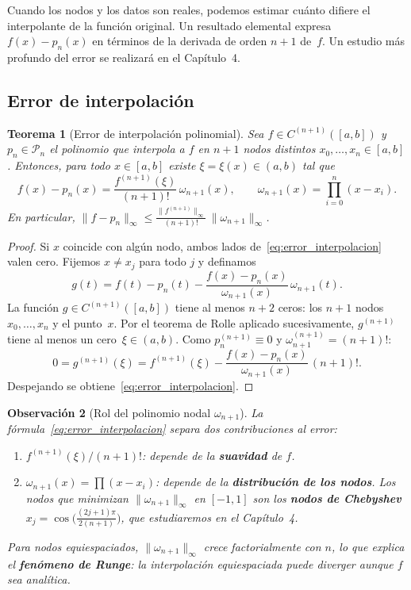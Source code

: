 \documentclass[a4paper,11pt]{report}
\newtheorem{theorem}{Teorema}[chapter]
\newtheorem{remark}[theorem]{Observación}
\begin{document}
Cuando los nodos y los datos son reales, podemos estimar cuánto difiere el interpolante de la función original. Un resultado elemental expresa $f(x)-p_n(x)$ en términos de la derivada de orden $n+1$ de~$f$. Un estudio más profundo del error se realizará en el Capítulo~4.

\subsection{Error de interpolación}\label{subsec:error_interpolacion}

\begin{theorem}[Error de interpolación polinomial]\label{thm:error_interpolacion}
Sea $f\in C^{(n+1)}([a,b])$ y $p_n\in\mathcal{P}_n$ el polinomio que interpola a $f$ en $n+1$ nodos distintos $x_0,\ldots,x_n\in[a,b]$.  Entonces, para todo $x\in[a,b]$ existe $\xi=\xi(x)\in(a,b)$ tal que
\begin{equation}\label{eq:error_interpolacion}
f(x)-p_n(x) = \frac{f^{(n+1)}(\xi)}{(n+1)!}\,\omega_{n+1}(x), \qquad \omega_{n+1}(x)=\prod_{i=0}^n(x-x_i).
\end{equation}
En particular, $\displaystyle\|f-p_n\|_\infty \le \frac{\|f^{(n+1)}\|_\infty}{(n+1)!}\,\|\omega_{n+1}\|_\infty$.
\end{theorem}

\begin{proof}
Si $x$ coincide con algún nodo, ambos lados de~\eqref{eq:error_interpolacion} valen cero.  Fijemos $x\neq x_j$ para todo $j$ y definamos
\[
g(t) = f(t) - p_n(t) - \frac{f(x)-p_n(x)}{\omega_{n+1}(x)}\,\omega_{n+1}(t).
\]
La función $g\in C^{(n+1)}([a,b])$ tiene al menos $n+2$ ceros: los $n+1$ nodos $x_0,\ldots,x_n$ y el punto~$x$.  Por el teorema de Rolle aplicado sucesivamente, $g^{(n+1)}$ tiene al menos un cero~$\xi\in(a,b)$.  Como $p_n^{(n+1)}\equiv 0$ y $\omega_{n+1}^{(n+1)}=(n+1)!$:
\[
0 = g^{(n+1)}(\xi) = f^{(n+1)}(\xi) - \frac{f(x)-p_n(x)}{\omega_{n+1}(x)}\,(n+1)!.
\]
Despejando se obtiene~\eqref{eq:error_interpolacion}.
\end{proof}

\begin{remark}[Rol del polinomio nodal $\omega_{n+1}$]
La fórmula~\eqref{eq:error_interpolacion} separa dos contribuciones al error:
\begin{enumerate}
\item $f^{(n+1)}(\xi)/(n+1)!$: depende de la \textbf{suavidad} de $f$.
\item $\omega_{n+1}(x) = \prod(x-x_i)$: depende de la \textbf{distribución de los nodos}.  Los nodos que minimizan $\|\omega_{n+1}\|_\infty$ en $[-1,1]$ son los \textbf{nodos de Chebyshev} $x_j=\cos\!\bigl(\frac{(2j+1)\pi}{2(n+1)}\bigr)$, que estudiaremos en el Capítulo~4.
\end{enumerate}
Para nodos \emph{equiespaciados}, $\|\omega_{n+1}\|_\infty$ crece factorialmente con $n$, lo que explica el \textbf{fenómeno de Runge}: la interpolación equiespaciada puede diverger aunque $f$ sea analítica.
\end{remark}
\end{document}
